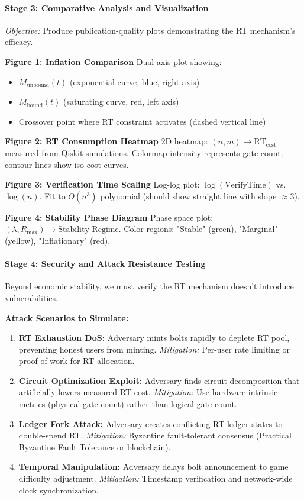 \documentclass[a4paper,10.5pt,twoside]{article}
\begin{document}
\paragraph{Stage 3: Comparative Analysis and Visualization}

\textit{Objective:} Produce publication-quality plots demonstrating the RT mechanism's efficacy.

\textbf{Figure 1: Inflation Comparison}  
Dual-axis plot showing:
\begin{itemize}
    \item $M_{\text{unbound}}(t)$ (exponential curve, blue, right axis)
    \item $M_{\text{bound}}(t)$ (saturating curve, red, left axis)
    \item Crossover point where RT constraint activates (dashed vertical line)
\end{itemize}

\textbf{Figure 2: RT Consumption Heatmap}  
2D heatmap: $(n, m) \to \text{RT}_{\text{cost}}$ measured from Qiskit simulations.  
Colormap intensity represents gate count; contour lines show iso-cost curves.

\textbf{Figure 3: Verification Time Scaling}  
Log-log plot: $\log(\text{VerifyTime}) $ vs. $\log(n)$.  
Fit to $O(n^3)$ polynomial (should show straight line with slope $\approx 3$).

\textbf{Figure 4: Stability Phase Diagram}  
Phase space plot: $(\lambda, R_{\max}) \to \text{Stability Regime}$.  
Color regions: "Stable" (green), "Marginal" (yellow), "Inflationary" (red).

\paragraph{Stage 4: Security and Attack Resistance Testing}

Beyond economic stability, we must verify the RT mechanism doesn't introduce vulnerabilities.

\textbf{Attack Scenarios to Simulate:}
\begin{enumerate}
    \item \textbf{RT Exhaustion DoS:} Adversary mints bolts rapidly to deplete RT pool, preventing honest users from minting. \textit{Mitigation:} Per-user rate limiting or proof-of-work for RT allocation.
    
    \item \textbf{Circuit Optimization Exploit:} Adversary finds circuit decomposition that artificially lowers measured RT cost. \textit{Mitigation:} Use hardware-intrinsic metrics (physical gate count) rather than logical gate count.
    
    \item \textbf{Ledger Fork Attack:} Adversary creates conflicting RT ledger states to double-spend RT. \textit{Mitigation:} Byzantine fault-tolerant consensus (Practical Byzantine Fault Tolerance or blockchain).
    
    \item \textbf{Temporal Manipulation:} Adversary delays bolt announcement to game difficulty adjustment. \textit{Mitigation:} Timestamp verification and network-wide clock synchronization.
\end{enumerate}
\end{document}
